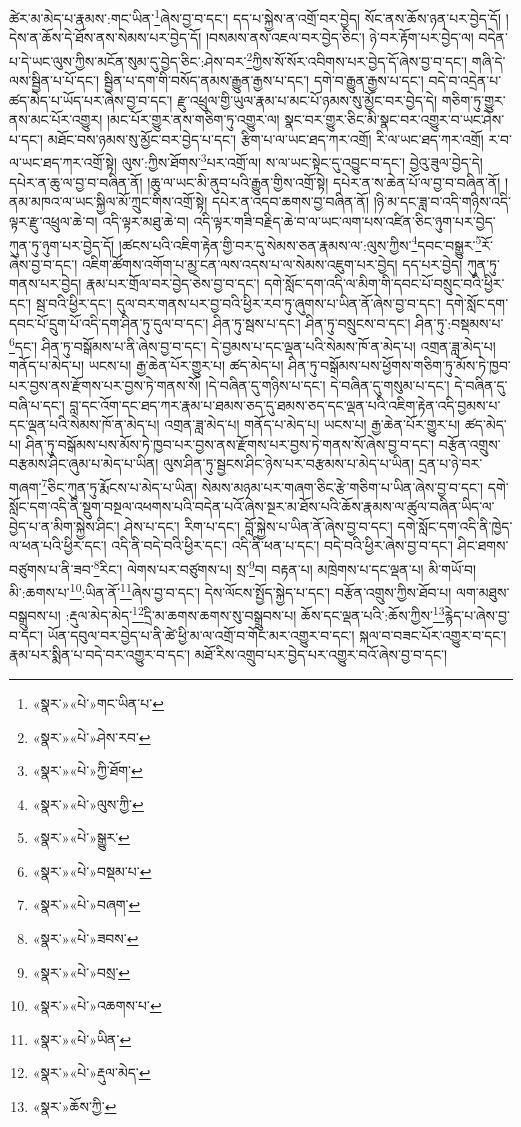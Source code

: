 ཚེར་མ་མེད་པ་རྣམས་:གང་ཡིན་\footnote{«སྣར་»«པེ་»གང་ཡིན་པ་}ཞེས་བྱ་བ་དང་། དད་པ་སྐྱེས་ན་འགྲོ་བར་བྱེད། སོང་ནས་ཆོས་ཉན་པར་བྱེད་དོ། །དེས་ན་ཆོས་དེ་ཐོས་ནས་སེམས་པར་བྱེད་དོ། །བསམས་ནས་འཇལ་བར་བྱེད་ཅིང་། ཉེ་བར་རྟོག་པར་བྱེད་ལ། བདེན་པ་དེ་ཡང་ལུས་ཀྱིས་མངོན་སུམ་དུ་བྱེད་ཅིང་:ཤེས་བར་\footnote{«སྣར་»«པེ་»ཤེས་རབ་}ཀྱིས་སོ་སོར་འབིགས་པར་བྱེད་དོ་ཞེས་བྱ་བ་དང་། གཞི་དེ་ལས་སྦྱིན་པ་པོ་དང་། སྦྱིན་པ་དག་གི་བསོད་ནམས་རྒྱུན་རྒྱས་པ་དང་། དགེ་བ་རྒྱུན་རྒྱས་པ་དང་། བདེ་བ་འདྲེན་པ་ཚད་མེད་པ་ཡོད་པར་ཞེས་བྱ་བ་དང་། རྫུ་འཕྲུལ་གྱི་ཡུལ་རྣམ་པ་མང་པོ་ཉམས་སུ་མྱོང་བར་བྱེད་དེ། གཅིག་ཏུ་གྱུར་ནས་མང་པོར་འགྱུར། །མང་པོར་གྱུར་ནས་གཅིག་ཏུ་འགྱུར་ལ། སྣང་བར་གྱུར་ཅིང་མི་སྣང་བར་འགྱུར་བ་ཡང་ཤེས་པ་དང་། མཐོང་བས་ཉམས་སུ་མྱོང་བར་བྱེད་པ་དང་། རྩིག་པ་ལ་ཡང་ཐད་ཀར་འགྲོ། རི་ལ་ཡང་ཐད་ཀར་འགྲོ། ར་བ་ལ་ཡང་ཐད་ཀར་འགྲོ་སྟེ། ལུས་:ཀྱིས་ཐོགས་\footnote{«སྣར་»«པེ་»ཀྱི་ཐོག་}པར་འགྲོ་ལ། ས་ལ་ཡང་སྟེང་དུ་འབྱུང་བ་དང་། བྱེའུ་ཟུལ་བྱེད་དེ། དཔེར་ན་ཆུ་ལ་བྱ་བ་བཞིན་ནོ། །ཆུ་ལ་ཡང་མི་ནུབ་པའི་རྒྱུན་གྱིས་འགྲོ་སྟེ། དཔེར་ན་ས་ཆེན་པོ་ལ་བྱ་བ་བཞིན་ནོ། །ནམ་མཁའ་ལ་ཡང་སྐྱིལ་མོ་ཀྲུང་གིས་འགྲོ་སྟེ། དཔེར་ན་འདབ་ཆགས་བྱ་བཞིན་ནོ། །ཉི་མ་དང་ཟླ་བ་འདི་གཉིས་འདི་ལྟར་རྫུ་འཕྲུལ་ཆེ་བ། འདི་ལྟར་མཐུ་ཆེ་བ། འདི་ལྟར་གཟི་བརྗིད་ཆེ་བ་ལ་ཡང་ལག་པས་འཛིན་ཅིང་ཉུག་པར་བྱེད་ཀུན་ཏུ་ཉུག་པར་བྱེད་དོ། །ཚངས་པའི་འཇིག་རྟེན་གྱི་བར་དུ་སེམས་ཅན་རྣམས་ལ་:ལུས་ཀྱིས་\footnote{«སྣར་»«པེ་»ལུས་ཀྱི་}དབང་བསྒྱུར་\footnote{«སྣར་»«པེ་»སྒྱུར་}རོ་ཞེས་བྱ་བ་དང་། འཇིག་ཚོགས་འགོག་པ་མྱ་ངན་ལས་འདས་པ་ལ་སེམས་འཇུག་པར་བྱེད། དད་པར་བྱེད། ཀུན་ཏུ་གནས་པར་བྱེད། རྣམ་པར་གྲོལ་བར་བྱེད་ཅེས་བྱ་བ་དང་། དགེ་སློང་དག་འདི་ལ་མིག་གི་དབང་པོ་བསྲུང་བའི་ཕྱིར་དང་། སྦ་བའི་ཕྱིར་དང་། དུལ་བར་གནས་པར་བྱ་བའི་ཕྱིར་རབ་ཏུ་ཞུགས་པ་ཡིན་ནོ་ཞེས་བྱ་བ་དང་། དགེ་སློང་དག་དབང་པོ་དྲུག་པོ་འདི་དག་ཤིན་ཏུ་དུལ་བ་དང་། ཤིན་ཏུ་སྦས་པ་དང་། ཤིན་ཏུ་བསྲུངས་བ་དང་། ཤིན་ཏུ་:བསྡམས་པ་\footnote{«སྣར་»«པེ་»བསྡམ་པ་}དང་། ཤིན་ཏུ་བསྒོམས་པ་ནི་ཞེས་བྱ་བ་དང་། དེ་བྱམས་པ་དང་ལྡན་པའི་སེམས་ཁོ་ན་མེད་པ། འགྲན་ཟླ་མེད་པ། གནོད་པ་མེད་པ། ཡངས་པ། རྒྱ་ཆེན་པོར་གྱུར་པ། ཚད་མེད་པ། ཤིན་ཏུ་བསྒོམས་པས་ཕྱོགས་གཅིག་ཏུ་མོས་ཏེ་ཁྱབ་པར་བྱས་ནས་རྫོགས་པར་བྱས་ཏེ་གནས་སོ། །དེ་བཞིན་དུ་གཉིས་པ་དང་། དེ་བཞིན་དུ་གསུམ་པ་དང་། དེ་བཞིན་དུ་བཞི་པ་དང་། བླ་དང་འོག་དང་ཐད་ཀར་རྣམ་པ་ཐམས་ཅད་དུ་ཐམས་ཅད་དང་ལྡན་པའི་འཇིག་རྟེན་འདི་བྱམས་པ་དང་ལྡན་པའི་སེམས་ཁོ་ན་མེད་པ། འགྲན་ཟླ་མེད་པ། གནོད་པ་མེད་པ། ཡངས་པ། རྒྱ་ཆེན་པོར་གྱུར་པ། ཚད་མེད་པ། ཤིན་ཏུ་བསྒོམས་པས་མོས་ཏེ་ཁྱབ་པར་བྱས་ནས་རྫོགས་པར་བྱས་ཏེ་གནས་སོ་ཞེས་བྱ་བ་དང་། བརྩོན་འགྲུས་བརྩམས་ཤིང་ཞུམ་པ་མེད་པ་ཡིན། ལུས་ཤིན་ཏུ་སྦྱངས་ཤིང་ཉེས་པར་བརྩམས་པ་མེད་པ་ཡིན། དྲན་པ་ཉེ་བར་གཞག་\footnote{«སྣར་»«པེ་»བཞག་}ཅིང་ཀུན་ཏུ་རྨོངས་པ་མེད་པ་ཡིན། སེམས་མཉམ་པར་གཞག་ཅིང་རྩེ་གཅིག་པ་ཡིན་ཞེས་བྱ་བ་དང་། དགེ་སློང་དག་འདི་ནི་སྡུག་བསྔལ་འཕགས་པའི་བདེན་པའོ་ཞེས་སྔར་མ་ཐོས་པའི་ཆོས་རྣམས་ལ་ཚུལ་བཞིན་ཡིད་ལ་བྱེད་པ་ན་མིག་སྐྱེས་ཤིང་། ཤེས་པ་དང་། རིག་པ་དང་། བློ་སྐྱེས་པ་ཡིན་ནོ་ཞེས་བྱ་བ་དང་། དགེ་སློང་དག་འདི་ནི་ཁྱེད་ལ་ཕན་པའི་ཕྱིར་དང་། འདི་ནི་བདེ་བའི་ཕྱིར་དང་། འདི་ནི་ཕན་པ་དང་། བདེ་བའི་ཕྱིར་ཞེས་བྱ་བ་དང་། ཤིང་ཐགས་བཙུགས་པ་ནི་ཟབ་\footnote{«སྣར་»«པེ་»ཟབས་}རིང་། ལེགས་པར་བཙུགས་པ། སྲ་\footnote{«སྣར་»«པེ་»བསྲ་}བ། བརྟན་པ། མཁྲེགས་པ་དང་ལྡན་པ། མི་གཡོ་བ། མི་:ཆགས་པ་\footnote{«སྣར་»«པེ་»འཆགས་པ་}:ཡིན་ནོ་\footnote{«སྣར་»«པེ་»ཡིན་}ཞེས་བྱ་བ་དང་། དེས་ལོངས་སྤྱོད་སྐྱེད་པ་དང་། བརྩོན་འགྲུས་ཀྱིས་ཐོབ་པ། ལག་མཐུས་བསྒྲུབས་པ། :རྡུལ་མེད་མེད་\footnote{«སྣར་»«པེ་»རྡུལ་མེད་}དྲི་མ་ཆགས་ཆགས་སུ་བསྒྲུབས་པ། ཆོས་དང་ལྡན་པའི་:ཆོས་ཀྱིས་\footnote{«སྣར་»ཆོས་ཀྱི་}རྙེད་པ་ཞེས་བྱ་བ་དང་། ཡོན་དབུལ་བར་བྱེད་པ་ནི་ཚེ་ཕྱི་མ་ལ་འགྲོ་བ་གོང་མར་འགྱུར་བ་དང་། སྐལ་བ་བཟང་པོར་འགྱུར་བ་དང་། རྣམ་པར་སྨིན་པ་བདེ་བར་འགྱུར་བ་དང་། མཐོ་རིས་འགྲུབ་པར་བྱེད་པར་འགྱུར་བའོ་ཞེས་བྱ་བ་དང་། 
